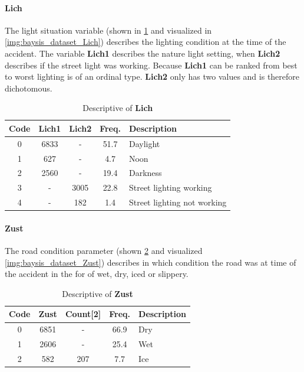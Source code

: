 \paragraph{Lich}
\label{baysis_dataset_Lich}
The light situation variable (shown in \cref{tbl:baysis_dataset_Lich} and visualized in \cref{img:baysis_dataset_Lich}) describes the lighting condition at the time of the accident. The variable \textbf{Lich1} describes the nature light setting, when \textbf{Lich2} describes if the street light was working. Because \textbf{Lich1} can be ranked from best to worst lighting is of an ordinal type. \textbf{Lich2} only has two values and is therefore dichotomous.
\begin{table}[ht]
	\centering
	\small
	\begin{tabular}{c|c|c|c|l}
		\toprule
		Code & \textbf{Lich1} & \textbf{Lich2} & Freq. & Description \\ 
		\midrule 
		0 & 6833 	& - 	& 51.7 & Daylight \\
		1 & 627 	& -		& 4.7  & Noon \\
		2 & 2560	& - 	& 19.4 & Darkness \\
		3 & - 		& 3005	& 22.8 & Street lighting working \\
		4 & - 		& 182	& 1.4  & Street lighting not working \\
		\bottomrule
	\end{tabular}
	\caption{Descriptive of \textbf{Lich}}
	\label{tbl:baysis_dataset_Lich}
	\vspace{-8mm}
\end{table} 
\paragraph{Zust}
\label{baysis_dataset_Zust}
The road condition parameter (shown \cref{tbl:baysis_dataset_Zust} and visualized \cref{img:baysis_dataset_Zust}) describes in which condition the road was at time of the accident in the for of wet, dry, iced or slippery.
\begin{table}[ht]
	\centering
	\small
	\begin{tabular}{c|c|c|c|l}
		\toprule
		Code & \textbf{Zust} & Count[2] & Freq. & Description \\ 
		\midrule 
		0 & 6851 	& -		& 66.9 & Dry \\ 
 		1 & 2606	& -		& 25.4 & Wet \\ 
 		2 & 582		& 207	& 7.7  & Ice \\
	\end{tabular}
	\caption{Descriptive of \textbf{Zust}}
	\label{tbl:baysis_dataset_Zust}
	\vspace{-8mm}
\end{table}
